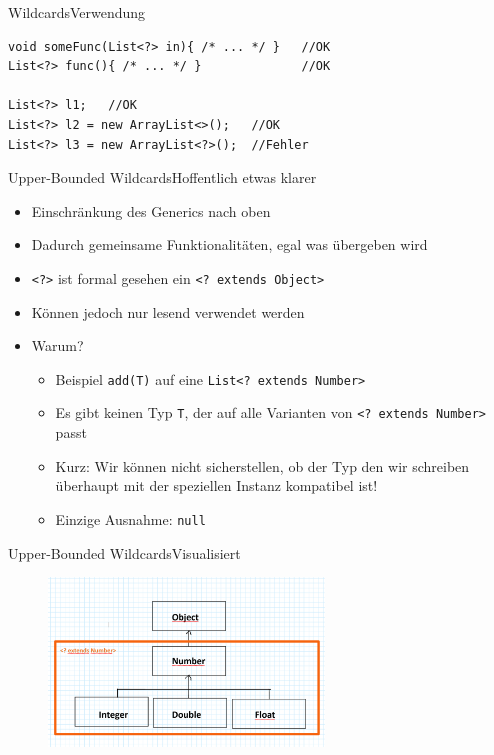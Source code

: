 \begin{frame}[fragile]{Wildcards}{Verwendung}
\lstset{style=java}
\begin{lstlisting}
void someFunc(List<?> in){ /* ... */ }   //OK
List<?> func(){ /* ... */ }              //OK

List<?> l1;   //OK
List<?> l2 = new ArrayList<>();   //OK
List<?> l3 = new ArrayList<?>();  //Fehler
\end{lstlisting}
\end{frame}

\begin{frame}{Upper-Bounded Wildcards}{Hoffentlich etwas klarer}
    \begin{itemize}[<+->]
        \item Einschränkung des Generics nach oben
        \item Dadurch gemeinsame Funktionalitäten, egal was übergeben wird
        \item \texttt{<?>} ist formal gesehen ein \texttt{<? extends Object>}
        \item Können jedoch nur lesend verwendet werden
        \item Warum?
        \begin{itemize}[<handout:0>]
            \item Beispiel \texttt{add(T)} auf eine \texttt{List<? extends Number>}
            \item Es gibt keinen Typ \texttt{T}, der auf alle Varianten von \texttt{<? extends Number>} passt
            \item Kurz: Wir können nicht sicherstellen, ob der Typ den wir schreiben überhaupt mit der speziellen Instanz kompatibel ist!
            \item Einzige Ausnahme: \texttt{null}
        \end{itemize}
    \end{itemize}
\end{frame}

\begin{frame}{Upper-Bounded Wildcards}{Visualisiert}
    \begin{figure}
        \centering
        \includegraphics[height=4.5cm]{graph/wildcard_upper}
    \end{figure}
\end{frame}

